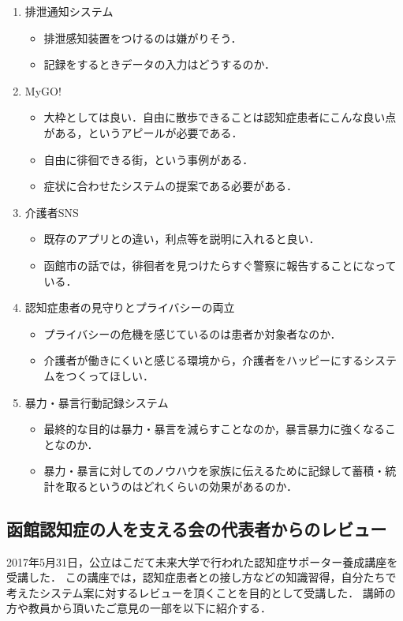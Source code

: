 \documentclass[../report]{subfiles}
\begin{document}
\begin{enumerate}
    \item[] 排泄通知システム
\begin{itemize}
    \item 排泄感知装置をつけるのは嫌がりそう．
    \item 記録をするときデータの入力はどうするのか．
\end{itemize}

    \item[] MyGO!
\begin{itemize}
    \item 大枠としては良い．自由に散歩できることは認知症患者にこんな良い点がある，というアピールが必要である．
    \item 自由に徘徊できる街，という事例がある．
    \item 症状に合わせたシステムの提案である必要がある．
\end{itemize}

    \item[] 介護者SNS
\begin{itemize}
    \item 既存のアプリとの違い，利点等を説明に入れると良い．
    \item 函館市の話では，徘徊者を見つけたらすぐ警察に報告することになっている．
\end{itemize}

    \item[] 認知症患者の見守りとプライバシーの両立
\begin{itemize}
    \item プライバシーの危機を感じているのは患者か対象者なのか．
    \item 介護者が働きにくいと感じる環境から，介護者をハッピーにするシステムをつくってほしい．
\end{itemize}

    \item[] 暴力・暴言行動記録システム
\begin{itemize}
    \item 最終的な目的は暴力・暴言を減らすことなのか，暴言暴力に強くなることなのか．
    \item 暴力・暴言に対してのノウハウを家族に伝えるために記録して蓄積・統計を取るというのはどれくらいの効果があるのか．
\end{itemize}
\end{enumerate}


\subsection{函館認知症の人を支える会の代表者からのレビュー} \label{sec:4_hyouka_before2}
2017年5月31日，公立はこだて未来大学で行われた認知症サポーター養成講座を受講した．
この講座では，認知症患者との接し方などの知識習得，自分たちで考えたシステム案に対するレビューを頂くことを目的として受講した．
講師の方や教員から頂いたご意見の一部を以下に紹介する．
\end{document}
